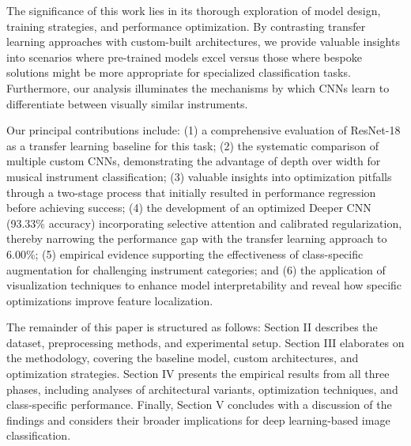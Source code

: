 The significance of this work lies in its thorough exploration of model design, training strategies, and performance optimization. By contrasting transfer learning approaches with custom-built architectures, we provide valuable insights into scenarios where pre-trained models excel versus those where bespoke solutions might be more appropriate for specialized classification tasks. Furthermore, our analysis illuminates the mechanisms by which CNNs learn to differentiate between visually similar instruments.

Our principal contributions include: (1) a comprehensive evaluation of ResNet-18 as a transfer learning baseline for this task; (2) the systematic comparison of multiple custom CNNs, demonstrating the advantage of depth over width for musical instrument classification; (3) valuable insights into optimization pitfalls through a two-stage process that initially resulted in performance regression before achieving success; (4) the development of an optimized Deeper CNN (93.33\% accuracy) incorporating selective attention and calibrated regularization, thereby narrowing the performance gap with the transfer learning approach to 6.00\%; (5) empirical evidence supporting the effectiveness of class-specific augmentation for challenging instrument categories; and (6) the application of visualization techniques to enhance model interpretability and reveal how specific optimizations improve feature localization.

The remainder of this paper is structured as follows: Section II describes the dataset, preprocessing methods, and experimental setup. Section III elaborates on the methodology, covering the baseline model, custom architectures, and optimization strategies. Section IV presents the empirical results from all three phases, including analyses of architectural variants, optimization techniques, and class-specific performance. Finally, Section V concludes with a discussion of the findings and considers their broader implications for deep learning-based image classification.
